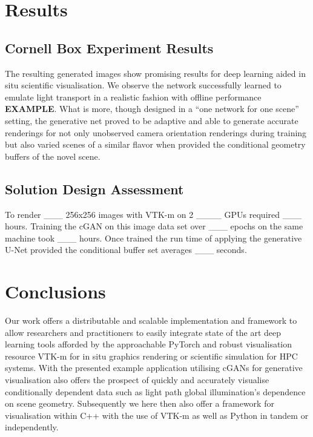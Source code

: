 \documentclass[conference]{IEEEtran}
\begin{document}
\section{Results}
\subsection{Cornell Box Experiment Results}
The resulting generated images show promising results for deep learning aided in situ scientific visualisation. We observe the network successfully learned to emulate light transport in a realistic fashion with offline performance {\bf EXAMPLE}. What is more, though designed in a ``one network for one scene'' setting, the generative net proved to be adaptive and able to generate accurate renderings for not only unobserved camera orientation renderings during training but also varied scenes of a similar flavor when provided the conditional geometry buffers of the novel scene. 

\subsection{Solution Design Assessment}

To render \_\_\_ 256x256 images with VTK-m on 2 \_\_\_\_ GPUs required \_\_\_ hours. Training the cGAN on this image data set over \_\_\_ epochs on the same machine took \_\_\_ hours. Once trained the run time of applying the generative U-Net provided the conditional buffer set averages \_\_\_ seconds. 

\section{Conclusions}

Our work offers a distributable and scalable implementation and framework to allow researchers and practitioners to easily integrate state of the art deep learning tools afforded by the approachable PyTorch and robust visualisation resource VTK-m for in situ graphics rendering or scientific simulation for HPC systems. With the presented example application utilising cGANs for generative visualisation also offers the prospect of quickly and accurately visualise conditionally dependent data such as light path global illumination's dependence on scene geometry. Subsequently we here then also offer a framework for visualisation within C++ with the use of VTK-m as well as Python in tandem or independently. 
\end{document}
